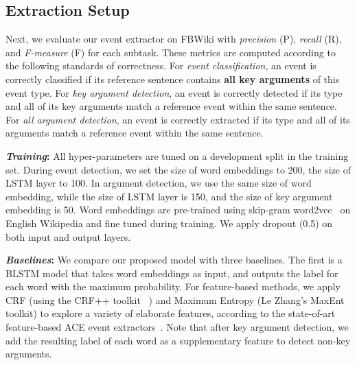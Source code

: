  \subsection{Extraction Setup}\label{sec:evalevent}
Next, we evaluate our event extractor on FBWiki  %
with \emph{precision} (P), \emph{recall} (R), and \emph{F-measure} (F) for each subtask. These metrics are computed according to the
following standards of correctness. For \emph{event classification}, an event is correctly classified if its reference sentence contains
\textbf{all key arguments} of this event type. For \emph{key argument detection}, an event is correctly detected if its type and all of its
key arguments match a reference event within the same sentence. For \emph{all argument detection}, an event is correctly extracted if its
type and all of its arguments match a reference event within the same sentence.

\vspace{2mm}


\noindent \textbf{\emph{Training}:} All hyper-parameters are tuned on a development split in the training set. During event detection, we
set the size of word embeddings to 200, the size of LSTM layer to 100. In argument detection, we use the same size of word embedding, while
the size of LSTM layer is 150, and the size of key argument embedding is 50. Word embeddings are pre-trained using skip-gram
word2vec~\cite{mikolov2013distributed} on English Wikipedia and fine tuned during training. We apply dropout (0.5) on both input and output
layers.




\vspace{2mm}\noindent\textbf{\emph{Baselines}:}
We compare our proposed model with three baselines.
The first is a  BLSTM model that takes word embeddings as input, and outputs the label for each word with the maximum probability. %
For feature-based methods, we apply CRF (using the CRF++ toolkit~\cite{kudo2005crf++} ) and Maximum Entropy \cite{berger1996maximum} (Le
Zhang's MaxEnt toolkit) to explore a variety of elaborate features, according to the state-of-art feature-based ACE event
extractors~\cite{li2013joint}. Note that after key argument detection, we add the resulting label of each word as a supplementary feature
to detect non-key arguments.

